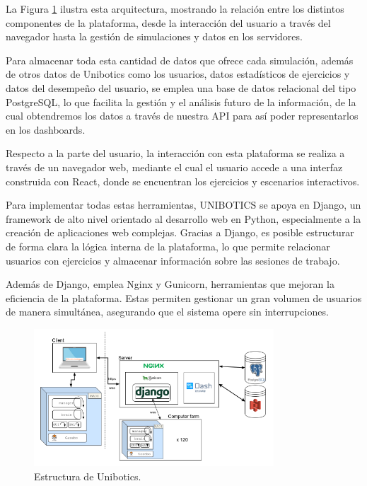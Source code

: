 \documentclass[a4paper, 12pt]{book}
\begin{document}
La Figura \ref{fig:arquitectura} ilustra esta arquitectura, mostrando la relación entre los distintos componentes de la plataforma, desde la interacción del usuario a través del navegador hasta la gestión de simulaciones y datos en los servidores.

Para almacenar toda esta cantidad de datos que ofrece cada simulación, además de otros datos de Unibotics como los usuarios, datos estadísticos de ejercicios y datos del desempeño del usuario, se emplea una base de datos relacional del tipo PostgreSQL, lo que facilita la gestión y el análisis futuro de la información, de la cual obtendremos los datos a través de nuestra API para así poder representarlos en los dashboards.

Respecto a la parte del usuario, la interacción con esta plataforma se realiza a través de un navegador web, mediante el cual el usuario accede a una interfaz construida con React, donde se encuentran los ejercicios y escenarios interactivos.

Para implementar todas estas herramientas, UNIBOTICS se apoya en Django, un framework de alto nivel orientado al desarrollo web en Python, especialmente a la creación de aplicaciones web complejas. Gracias a Django, es posible estructurar de forma clara la lógica interna de la plataforma, lo que permite relacionar usuarios con ejercicios y almacenar información sobre las sesiones de trabajo.

Además de Django, emplea Nginx y Gunicorn, herramientas que mejoran la eficiencia de la plataforma. Estas permiten gestionar un gran volumen de usuarios de manera simultánea, asegurando que el sistema opere sin interrupciones.

\begin{figure}
  \centering
  \includegraphics[width=0.8\textwidth, keepaspectratio]{img/arquitectura.png}
  \caption{Estructura de Unibotics.}\label{fig:arquitectura}
\end{figure}
\end{document}
